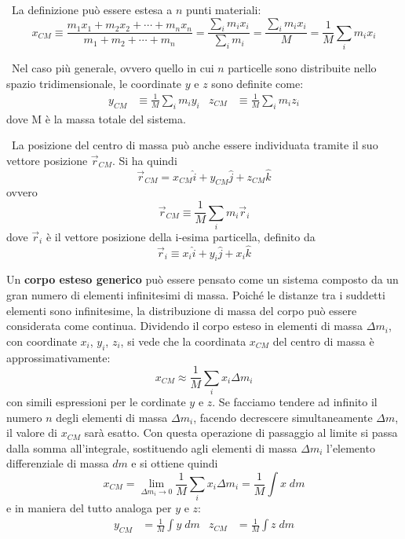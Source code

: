 \documentclass[a4paper,11pt,oneside]{book}
\begin{document}
~\newline La definizione può essere estesa a $n$ punti materiali:
\begin{equation*}
    x_{CM} \equiv \frac{m_1x_1 + m_2x_2 + \cdots + m_nx_n}{m_1 + m_2 + \cdots + m_n} = \frac{\sum_i m_ix_i}{\sum_i m_i} = \frac{\sum_i m_ix_i}{M} = \frac{1}{M}\sum_i m_ix_i
\end{equation*}

~\newline Nel caso più generale, ovvero quello in cui $n$ particelle sono distribuite nello spazio tridimensionale, le coordinate $y$ e $z$ sono definite come:
\begin{align*}
    y_{CM} &\equiv \frac{1}{M} \sum_i m_iy_i & z_{CM} &\equiv \frac{1}{M} \sum_i m_iz_i
\end{align*}
dove M è la massa totale del sistema.

~\newline La posizione del centro di massa può anche essere individuata tramite il suo vettore posizione $\vec{r}_{CM}$. Si ha quindi 
\begin{equation*}
    \vec{r}_{CM} = x_{CM}\hat{i} + y_{CM}\hat{j} + z_{CM}\hat{k}
\end{equation*}
ovvero
\begin{equation*}
    \vec{r}_{CM} \equiv \frac{1}{M} \sum_i m_i \vec{r}_i
\end{equation*}
dove $\vec{r}_i$ è il vettore posizione della i-esima particella, definito da 
\begin{equation*}
    \vec{r}_i \equiv x_i \hat{i} + y_i \hat{j} + x_i \hat{k}
\end{equation*}

Un \textbf{corpo esteso generico} può essere pensato come un sistema composto da un gran numero di elementi infinitesimi di massa.
Poiché le distanze tra i suddetti elementi sono infinitesime, la distribuzione di massa del corpo può essere considerata come continua.
Dividendo il corpo esteso in elementi di massa $\Delta m_i$, con coordinate $x_i$, $y_i$, $z_i$, si vede che la coordinata $x_{CM}$ del centro di massa è approssimativamente:
\begin{equation*}
    x_{CM} \approx \frac{1}{M} \sum_i x_i \Delta m_i
\end{equation*}
con simili espressioni per le cordinate $y$ e $z$. Se facciamo tendere ad infinito il numero $n$ degli elementi di massa $\Delta m_i$, facendo decrescere simultaneamente $\Delta m$, il valore di $x_{CM}$ sarà esatto. Con questa operazione di 
passaggio al limite si passa dalla somma all’integrale, sostituendo agli elementi di massa $\Delta m_i$ l’elemento differenziale di massa $dm$ e si ottiene quindi
\begin{equation*}
    x_{CM} = \lim_{\Delta m_i \to 0} \frac{1}{M} \sum_i x_i \Delta m_i = \frac{1}{M} \int x \; dm
\end{equation*}
e in maniera del tutto analoga per $y$ e $z$:
\begin{align*}
    y_{CM} &= \frac{1}{M} \int y \; dm & z_{CM} &= \frac{1}{M} \int z \; dm
\end{align*}
\end{document}
